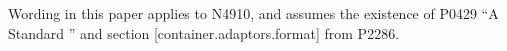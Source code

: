 
% 

Wording in this paper applies to N4910, and assumes the existence of P0429 ``A
Standard '' and section [container.adaptors.format] from
P2286.

\markboth{\contentsname}{}

\makeatletter
\renewcommand\@pnumwidth{2.5em}
\makeatother

\tableofcontents
\setcounter{tocdepth}{5}

%
